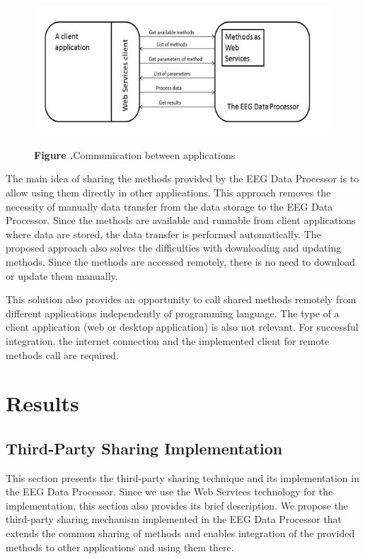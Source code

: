 \documentclass{frontiersSCNS} %
\begin{document}
\begin{figure}
\begin{center}
\includegraphics[width=18cm]{methods}%
\end{center}
\textbf{\label{fig:01} Figure .}{Communication between applications }
\end{figure}

The main idea of sharing the methods provided by the EEG Data Processor is to allow using them directly in other applications. This approach removes the necessity of manually data transfer from the data storage to the EEG Data Processor. Since the methods are available and runnable from client applications where data are stored, the data transfer is performed automatically. The proposed approach also solves the difficulties with downloading and updating methods. Since the methods are accessed remotely, there is no need to download or update them manually.

This solution also provides an opportunity to call shared methods remotely from different applications independently of programming language. The type of a client application (web or desktop application) is also not relevant. For successful integration, the internet connection and the implemented client for remote methods call are required.

\section{Results}

\subsection{Third-Party Sharing Implementation}

This section presents the third-party sharing technique and its implementation in the EEG Data Processor. Since we use the Web Services technology for the implementation, this section also provides its brief description. We propose the third-party sharing mechanism implemented in the EEG Data Processor that extends the common sharing of methods and enables integration of the provided methods to other applications and using them there.
\end{document}
